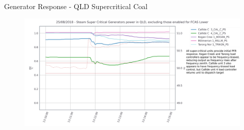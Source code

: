 \begin{frame}{Generator Response - QLD Supercritical Coal }

\begin{figure}
    \centering
    \includegraphics[width=\linewidth]{figures/QLD_Steam Super-Critical_PU_annotated.png}
    \label{fig:qld_super}
\end{figure}


\end{frame}

